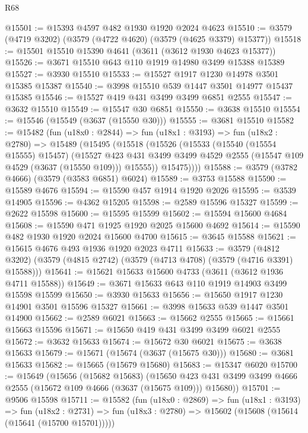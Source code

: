 \begin{lexlean}{R68}
\begin{coremodule}
@15501 := @15393 @4597 @482 @1930 @1920 @2024 @4623
@15510 := @3579 (@4719 @3202) (@3579 (@4722 @4620) (@3579 (@4625 @3379) @15377))
@15518 := @15501 @15510 @15390 @4641 (@3611 (@3612 @1930 @4623 @15377))
@15526 := @3671 @15510 @643 @110 @1919 @14980 @3499 @15388 @15389
@15527 := @3930 @15510
@15533 := @15527 @1917 @1230 @14978 @3501 @15385 @15387
@15540 := @3998 @15510 @539 @1447 @3501 @14977 @15437 @15385
@15546 := @15527 @419 @431 @3499 @3499 @6851 @2555
@15547 := @3632 @15510
@15549 := @15547 @30 @6851
@15550 := @3638 @15510
@15554 := @15546 (@15549 (@3637 (@15550 @30)))
@15555 := @3681 @15510
@15582 := @15482
    (fun (u18x0 : @2844) =>
    fun (u18x1 : @3193) =>
    fun (u18x2 : @2780) =>
    @15489
      (@15495
        (@15518
          (@15526
            (@15533
              (@15540 (@15554 @15555) @15457)
              (@15527
                @423
                @431
                @3499
                @3499
                @4529
                @2555
                (@15547 @109 @4529 (@3637 (@15550 @109)))
                @15555))
            @15475))))
@15588 := @3579 (@3782 @4666) (@3579 (@3583 @6851) @6024)
@15589 := @3753 @15588
@15590 := @15589 @4676
@15594 := @15590 @457 @1914 @1920 @2026
@15595 := @3539 @14905
@15596 := @4362 @15205
@15598 := @2589 @15596 @15327
@15599 := @2622 @15598
@15600 := @15595 @15599
@15602 := @15594 @15600 @4684
@15608 := @15590 @471 @1925 @1920 @2025 @15600 @4692
@15614 := @15590 @482 @1930 @1920 @2024 @15600 @4700
@15615 := @3645 @15588
@15621 := @15615 @4676 @493 @1936 @1920 @2023 @4711
@15633 := @3579
    (@4812 @3202)
    (@3579 (@4815 @2742) (@3579 (@4713 @4708) (@3579 (@4716 @3391) @15588)))
@15641 := @15621 @15633 @15600 @4733 (@3611 (@3612 @1936 @4711 @15588))
@15649 := @3671 @15633 @643 @110 @1919 @14903 @3499 @15598 @15599
@15650 := @3930 @15633
@15656 := @15650 @1917 @1230 @14901 @3501 @15596 @15327
@15661 := @3998 @15633 @539 @1447 @3501 @14900
@15662 := @2589 @6021
@15663 := @15662 @2555
@15665 := @15661 @15663 @15596
@15671 := @15650 @419 @431 @3499 @3499 @6021 @2555
@15672 := @3632 @15633
@15674 := @15672 @30 @6021
@15675 := @3638 @15633
@15679 := @15671 (@15674 (@3637 (@15675 @30)))
@15680 := @3681 @15633
@15682 := @15665 (@15679 @15680)
@15683 := @15347 @6020
@15700 := @15649
    (@15656
      (@15682 @15683)
      (@15650 @423 @431 @3499 @3499 @4666 @2555 (@15672 @109 @4666 (@3637 (@15675 @109))) @15680))
@15701 := @9506 @15598
@15711 := @15582
    (fun (u18x0 : @2869) =>
    fun (u18x1 : @3193) =>
    fun (u18x2 : @2731) => fun (u18x3 : @2780) => @15602 (@15608 (@15614 (@15641 (@15700 @15701)))))

\end{coremodule}
\end{lexlean}
